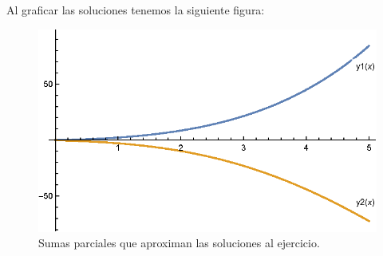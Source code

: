\begin{ejemplo}
Al graficar las soluciones tenemos la siguiente figura:
\begin{figure}
   \centering
   \includegraphics[scale=1]{Imagenes/Segunda_Solucion_Series_01.eps}
   \caption{Sumas parciales que aproximan las soluciones al ejercicio.}
\end{figure}
\end{ejemplo}
